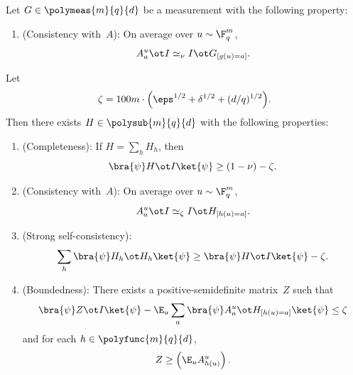 \begin{lemma}\label{lem:self-improvement-helper}
  \leanok
  Let $G \in \polymeas{m}{q}{d}$ be a measurement with the following property:
  \begin{enumerate}
    \item (Consistency with~$A$): \label{item:self-improvement-G-consistency} On average over $u \sim \F_q^{m}$,
    \[
      A^{u}_a \ot I \simeq_{\nu} I \ot G_{[g(u)=a]}.
    \]
  \end{enumerate}
  Let
  \[
    \zeta = 100m\cdot \Big(\eps^{1/2} + \delta^{1/2} + (d/q)^{1/2}\Big).
  \]
  Then there exists $H \in \polysub{m}{q}{d}$ with the following properties:
  \begin{enumerate}
    \item (Completeness): \label{item:self-improvement-completeness} If $H = \sum_h H_h$, then
    \[
      \bra{\psi} H \ot I \ket{\psi} \geq (1-\nu)-\zeta.
    \]
    \item (Consistency with~$A$): \label{item:self-improvement-A-consistency} On average over $u \sim \F_q^m$,
    \[
      A^u_a \ot I \simeq_{\zeta} I \ot H_{[h(u) = a]}.
    \]
    \item (Strong self-consistency): \label{item:self-improvement-self}
    \[
      \sum_{h} \bra{\psi} H_h \ot H_h \ket{\psi} \geq \bra{\psi} H \ot I \ket{\psi} - \zeta.
    \]
    \item (Boundedness): \label{item:self-improvement-boundedness} There exists a positive-semidefinite matrix~$Z$ such that
    \[
      \bra{\psi} Z \ot I \ket{\psi} -\E_{u} \sum_a \bra{\psi}  A^{u}_{a} \ot H_{[h(u)=a]} \ket{\psi} \leq \zeta
    \]
    and for each $h \in \polyfunc{m}{q}{d}$,
    \[
      Z \geq \left(\E_{u} A^{u}_{h(u)}\right).
    \]
  \end{enumerate}
\end{lemma}
